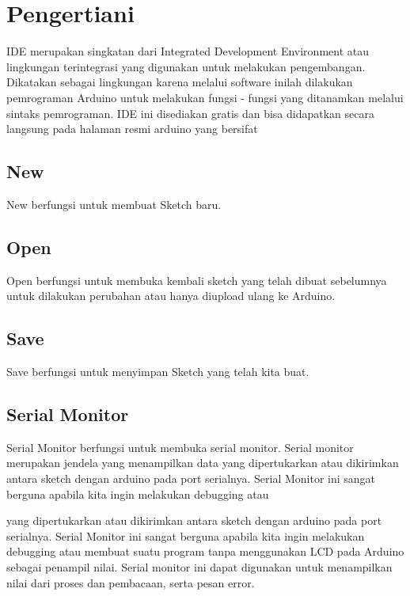 ﻿%

\section{Pengertiani}


IDE merupakan singkatan dari Integrated Development Environment atau lingkungan terintegrasi yang digunakan untuk melakukan pengembangan. Dikatakan sebagai lingkungan karena melalui software inilah dilakukan pemrograman Arduino untuk melakukan fungsi - fungsi yang ditanamkan melalui sintaks pemrograman. IDE ini disediakan gratis dan bisa didapatkan secara langsung pada halaman resmi arduino yang bersifat        
\subsection{New}
New berfungsi untuk membuat Sketch baru.
\subsection{Open}
Open berfungsi untuk membuka kembali sketch yang telah dibuat sebelumnya untuk dilakukan perubahan atau hanya diupload ulang ke Arduino.
\subsection{Save}
Save berfungsi untuk menyimpan Sketch yang telah kita buat.
\subsection{Serial Monitor}
Serial Monitor berfungsi untuk membuka serial monitor. Serial monitor merupakan jendela yang menampilkan data yang dipertukarkan atau dikirimkan antara sketch dengan arduino pada port serialnya. Serial Monitor ini sangat berguna apabila kita ingin melakukan debugging atau


yang dipertukarkan atau dikirimkan antara sketch dengan arduino pada port serialnya. Serial Monitor ini sangat berguna apabila kita ingin melakukan debugging atau membuat suatu program tanpa menggunakan LCD pada Arduino sebagai penampil nilai. Serial monitor ini dapat digunakan untuk menampilkan nilai dari proses dan pembacaan, serta pesan error.

